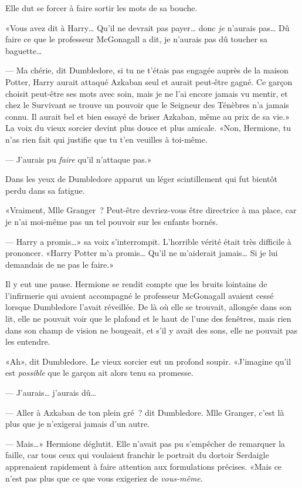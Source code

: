 Elle dut se forcer à faire sortir les mots de sa bouche.

«Vous avez dit à Harry… Qu'il ne devrait pas payer… donc \emph{je} n'aurais pas… Dû faire ce que le professeur McGonagall a dit, je n'aurais pas dû toucher sa baguette…

--- Ma chérie, dit Dumbledore, si tu ne t'étais pas engagée auprès de la maison Potter, Harry aurait attaqué Azkaban seul et aurait peut-être gagné. Ce garçon choisit peut-être ses mots avec soin, mais je ne l'ai encore jamais vu mentir, et chez le Survivant se trouve un pouvoir que le Seigneur des Ténèbres n'a jamais connu. Il aurait bel et bien essayé de briser Azkaban, même au prix de sa vie.» La voix du vieux sorcier devint plus douce et plus amicale. «Non, Hermione, tu n'as rien fait qui justifie que tu t'en veuilles à toi-même.

--- J'aurais pu \emph{faire} qu'il n'attaque pas.»

Dans les yeux de Dumbledore apparut un léger scintillement qui fut bientôt perdu dans sa fatigue.

«Vraiment, Mlle Granger~? Peut-être devriez-vous être directrice à ma place, car je n'ai moi-même pas un tel pouvoir sur les enfants bornés.

--- Harry a promis…» sa voix s'interrompit. L'horrible vérité était très difficile à prononcer. «Harry Potter m'a promis… Qu'il ne m'aiderait jamais… Si je lui demandais de ne pas le faire.»

Il y eut une pause. Hermione se rendit compte que les bruits lointains de l'infirmerie qui avaient accompagné le professeur McGonagall avaient cessé lorsque Dumbledore l'avait réveillée. De là où elle se trouvait, allongée dans son lit, elle ne pouvait voir que le plafond et le haut de l'une des fenêtres, mais rien dans son champ de vision ne bougeait, et s'il y avait des sons, elle ne pouvait pas les entendre.

«Ah», dit Dumbledore. Le vieux sorcier eut un profond soupir. «J'imagine qu'il est \emph{possible} que le garçon ait alors tenu sa promesse.

--- J'aurais… j'aurais dû…

--- Aller à Azkaban de ton plein gré~? dit Dumbledore. Mlle Granger, c'est là plus que je n'exigerai jamais d'un autre.

--- Mais…» Hermione déglutit. Elle n'avait pas pu s'empêcher de remarquer la faille, car tous ceux qui voulaient franchir le portrait du dortoir Serdaigle apprenaient rapidement à faire attention aux formulations précises. «Mais ce n'est pas plus que ce que vous exigeriez de \emph{vous-même}.

